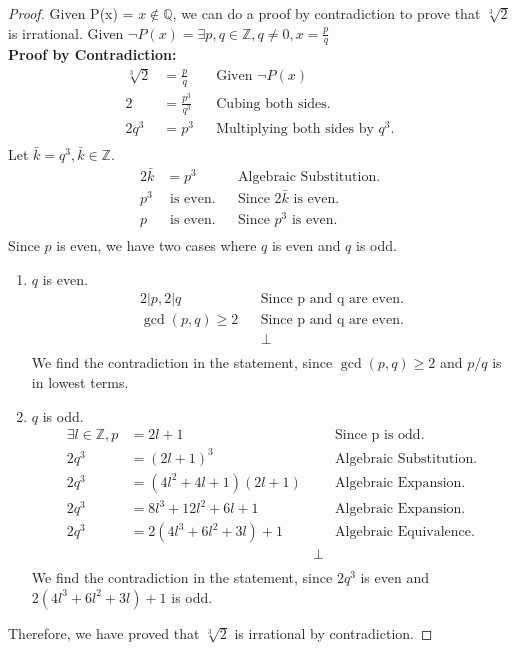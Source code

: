 \documentclass{article}
\newcommand{\AllIntegers}{\mathbb{Z}}
\newcommand{\AllRationals}{\mathbb{Q}}
\begin{document}
\begin{proof}
    Given P(x) = \(x \notin \AllRationals\), we can do a proof by contradiction to prove that \(\sqrt[3]{2}\) is irrational. Given \(\neg P(x) = \exists p,q \in \AllIntegers, q\neq 0, x = \frac{p}{q}\)\\
    \textbf{Proof by Contradiction:}\\
    \begin{align*}
        \sqrt[3]{2} &= \frac{p}{q} && \text{Given } \neg P(x)\\
        2 &= \frac{p^3}{q^3} && \text{Cubing both sides.}\\
        2q^3 &= p^3 && \text{Multiplying both sides by } q^3.\\
    \end{align*}
    Let \(\bar{k} = q^3, \bar{k} \in \AllIntegers\).
    \begin{align*}
        2\bar{k} &= p^3 && \text{Algebraic Substitution.}\\
        p^3 &\text{ is even.} && \text{Since } 2\bar{k} \text{ is even.}\\
        p &\text{ is even.} && \text{Since } p^3 \text{ is even.}\\
    \end{align*}
    Since \(p\) is even, we have two cases where \(q\) is even and \(q\) is odd.\\
    \begin{enumerate}
        \item \(q\) is even.\\
        \begin{align*}
            2|p, 2|q&&\text{Since p and q are even.}\\
            \gcd(p,q) \geq 2&&\text{Since p and q are even.}\\
            &&\bot\\
        \end{align*}
        We find the contradiction in the statement, since \(\gcd(p,q) \geq 2\) and \(p/q\) is in lowest terms.
        \item \(q\) is odd.\\
        \begin{align*}
            \exists l \in \AllIntegers, p &= 2l + 1&&\text{Since p is odd.}\\
            2q^3 &= (2l + 1)^3&&\text{Algebraic Substitution.}\\
            2q^3 &= (4l^2 + 4l + 1)(2l + 1)&&\text{Algebraic Expansion.}\\
            2q^3 &= 8l^3 + 12l^2 + 6l + 1&&\text{Algebraic Expansion.}\\
            2q^3 &= 2(4l^3 + 6l^2 + 3l) + 1&&\text{Algebraic Equivalence.}\\
            &&\bot\\
        \end{align*}
        We find the contradiction in the statement, since \(2q^3\) is even and \(2(4l^3 + 6l^2 + 3l) + 1\) is odd.
    \end{enumerate}
    Therefore, we have proved that \(\sqrt[3]{2}\) is irrational by contradiction.
\end{proof}
\end{document}
